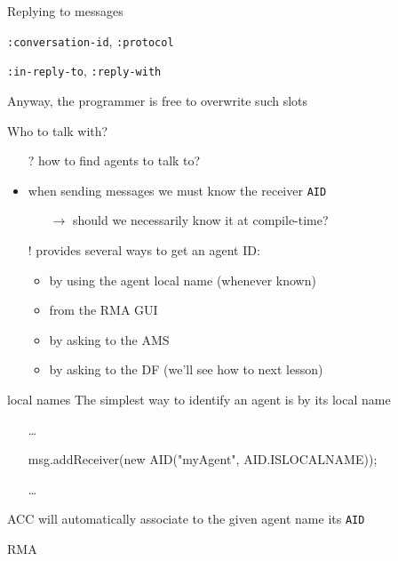 \documentclass{beamer}\mode<presentation>{\usetheme{AMSCesenaPurpleAndGold}}
\begin{document}
\begin{frame}[c,allowframebreaks]
\begin{block}{Replying to messages}
\begin{itemize}
\begin{small}
                \item \texttt{:conversation-id}, \texttt{:protocol}
                \item \texttt{:in-reply-to}, \texttt{:reply-with}
        \end{small}\end{itemize}
        Anyway, the programmer is free to overwrite such slots
    \end{block}
    \begin{block}{Who to talk with?}
        \begin{itemize}
            \item[?] how to find agents to talk to?
            \item when sending messages we must know the receiver \texttt{AID}
            \begin{itemize}
                \item[$\rightarrow$] should we necessarily know it at compile-time?
            \end{itemize}
            \item[!] \jade{} provides several ways to get an agent ID:
            \begin{itemize}
                \item by using the agent \alert{local name} (whenever known)
                \item from the RMA GUI
                \item by asking to the AMS
                \item by asking to the DF (we'll see how to next lesson)
            \end{itemize}
        \end{itemize}
    \end{block}
    \begin{block}{\jade{} local names}
        The simplest way to identify an agent is by its local name
        \begin{itemize}\tt
            \item[]\ldots
            \item[] msg.addReceiver(new AID("myAgent", \alert{AID.ISLOCALNAME}));
            \item[] \ldots
        \end{itemize}
        \jade{} ACC will automatically associate to the given agent name its \texttt{AID}
    \end{block}
    \begin{block}{\jade{} RMA}

\end{block}
\end{frame}
\end{document}

